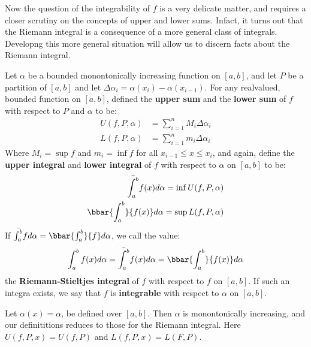 Now the question of the integrability of $f$ is a very delicate matter, and
requires a closer scrutiny on the concepts of upper and lower sums. Infact, it
turns out that the Riemann integral is a consequence of a more general class of
integrals. Developng this more general situation will allow us to discern facts
about the Riemann integral.

\begin{definition}
    Let $\alpha$ be a bounded monontonically increasing function on  $[a,b]$,
    and let  $P$ be a partition of  $[a,b]$ and let
    $\Delta{\alpha_i}=\alpha(x_i)-\alpha(x_{i-1})$. For any realvalued, bounded
    function on  $[a,b]$, defined the \textbf{upper sum} and the \textbf{lower
    sum} of $f$ with respect to  $P$ and  $\alpha$ to be: 
        \begin{align}
            U(f,P,\alpha) &= \sum_{i=1}^{n}{M_i\Delta{\alpha_i}} \\		
            L(f,P,\alpha) &= \sum_{i=1}^{n}{m_i\Delta{\alpha_i}}
        \end{align}
        Where $M_i=\sup{f}$ and  $m_i=\inf{f}$ for all  $x_{i-1} \leq x \leq
        x_i$, and again, define the \textbf{upper integral} and  \textbf{lower
        integral} of $f$ with respect to  $\alpha$ on  $[a,b]$ to be:
            \begin{align}
                \bar{\int_{a}^{b}}{f(x)}d\alpha=\inf{U(f,P,\alpha)} \\
                \bbar{\int_{a}^{b}}{f(x)}d\alpha=\sup{L(f,P,\alpha)}	
            \end{align}
            If $\bar{\int_{a}^{b}}{f}d\alpha=\bbar{\int_{a}^{b}}{f}d\alpha$, we
            call the value:
                \begin{equation}
                    \int_{a}^{b}{f(x)}d\alpha=\bar{\int_{a}^{b}}{f(x)}d\alpha=\bbar{\int_{a}^{b}}{f(x)}d\alpha
                \end{equation}
            the \textbf{Riemann-Stieltjes integral} of $f$ with respect to  $f$
            on  $[a,b]$. If such an integra exists, we say that  $f$ is
            \textbf{integrable} with respect to  $\alpha$ on  $[a,b]$.
\end{definition}

\begin{example}
    Let $\alpha(x)=\alpha$, be defined over  $[a,b]$. Then  $\alpha$ is
    monontonically increasing, and our definititions reduces to those for the
    Riemann integral. Here  $U(f,P,x)=U(f,P)$ and  $L(f,P,x)=L(F,P)$.
\end{example} 

